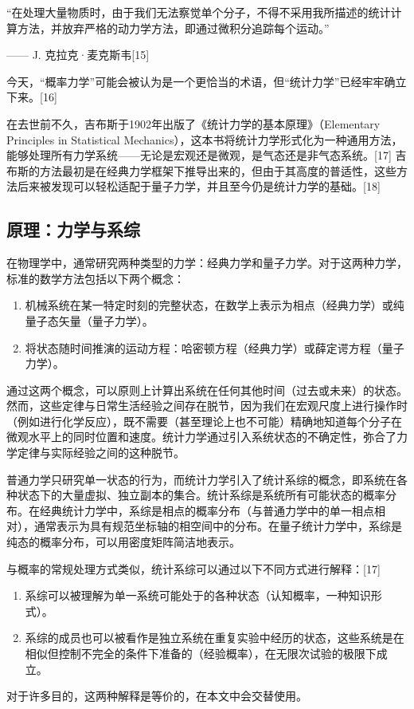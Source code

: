 “在处理大量物质时，由于我们无法察觉单个分子，不得不采用我所描述的统计计算方法，并放弃严格的动力学方法，即通过微积分追踪每个运动。”

—— J. 克拉克·麦克斯韦[15]  

今天，“概率力学”可能会被认为是一个更恰当的术语，但“统计力学”已经牢牢确立下来。[16] 

在去世前不久，吉布斯于1902年出版了《统计力学的基本原理》（Elementary Principles in Statistical Mechanics），这本书将统计力学形式化为一种通用方法，能够处理所有力学系统——无论是宏观还是微观，是气态还是非气态系统。[17] 吉布斯的方法最初是在经典力学框架下推导出来的，但由于其高度的普适性，这些方法后来被发现可以轻松适配于量子力学，并且至今仍是统计力学的基础。[18]
\subsection{原理：力学与系综} 
在物理学中，通常研究两种类型的力学：经典力学和量子力学。对于这两种力学，标准的数学方法包括以下两个概念：
\begin{enumerate}
\item 机械系统在某一特定时刻的完整状态，在数学上表示为相点（经典力学）或纯量子态矢量（量子力学）。  
\item 将状态随时间推演的运动方程：哈密顿方程（经典力学）或薛定谔方程（量子力学）。
\end{enumerate}
通过这两个概念，可以原则上计算出系统在任何其他时间（过去或未来）的状态。然而，这些定律与日常生活经验之间存在脱节，因为我们在宏观尺度上进行操作时（例如进行化学反应），既不需要（甚至理论上也不可能）精确地知道每个分子在微观水平上的同时位置和速度。统计力学通过引入系统状态的不确定性，弥合了力学定律与实际经验之间的这种脱节。

普通力学只研究单一状态的行为，而统计力学引入了统计系综的概念，即系统在各种状态下的大量虚拟、独立副本的集合。统计系综是系统所有可能状态的概率分布。在经典统计力学中，系综是相点的概率分布（与普通力学中的单一相点相对），通常表示为具有规范坐标轴的相空间中的分布。在量子统计力学中，系综是纯态的概率分布，可以用密度矩阵简洁地表示。

与概率的常规处理方式类似，统计系综可以通过以下不同方式进行解释：[17]  
\begin{enumerate}
\item 系综可以被理解为单一系统可能处于的各种状态（认知概率，一种知识形式）。  
\item 系综的成员也可以被看作是独立系统在重复实验中经历的状态，这些系统是在相似但控制不完全的条件下准备的（经验概率），在无限次试验的极限下成立。 
\end{enumerate} 
对于许多目的，这两种解释是等价的，在本文中会交替使用。


